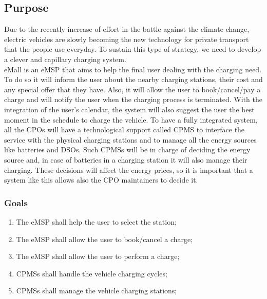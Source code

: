


\subsection{Purpose}
Due to the recently increase of effort in the battle against the climate change, electric vehicles are slowly becoming the new technology for private transport that the people use everyday.
To sustain this type of strategy, we need to develop a clever and capillary charging system.\\
\ac{eMall} is an \ac{eMSP} that aims to help the final user dealing with the charging need.
To do so it will inform the user about the nearby charging stations, their cost and any special offer that they have.
Also, it will allow the user to book/cancel/pay a charge and will notify the user when the charging process is terminated.
With the integration of the user's calendar, the system will also suggest the user the best moment in the schedule to charge the vehicle.
To have a fully integrated system, all the \acp{CPO} will have a technological support called \ac{CPMS} to interface the service with the physical charging stations and to manage all the energy sources like batteries and \acp{DSO}.
Such \acp{CPMS} will be in charge of deciding the energy source and, in case of batteries in a charging station it will also manage their charging.
These decisions will affect the energy prices, so it is important that a system like this allows also the \ac{CPO} maintainers to decide it.
\subsubsection{Goals}
%
\begin{enumerate}[label=\textbf{G\arabic*}]
    \item The \ac{eMSP} shall help the user to select the station; \label{goal:eMSP-helps-selecting}
    \item The \ac{eMSP} shall allow the user to book/cancel a charge; \label{goal:eMSP-booking-charge}
    \item The \ac{eMSP} shall allow the user to perform a charge; \label{goal:eMSP-allow-charge}
    \item \acp{CPMS} shall handle the vehicle charging cycles; \label{goal:CPMS-handles-charge}
    \item \acp{CPMS} shall manage the vehicle charging stations; \label{goal:CPMS-manage-station}
\end{enumerate}

